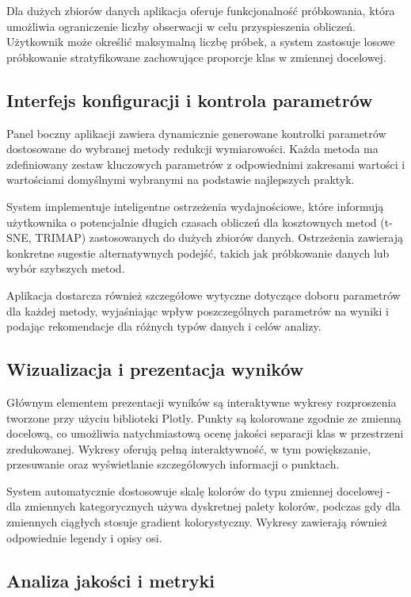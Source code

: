 \documentclass[a4paper, 12pt]{article}
\begin{document}
Dla dużych zbiorów danych aplikacja oferuje funkcjonalność próbkowania, która umożliwia ograniczenie liczby obserwacji w celu przyspieszenia obliczeń. Użytkownik może określić maksymalną liczbę próbek, a system zastosuje losowe próbkowanie stratyfikowane zachowujące proporcje klas w zmiennej docelowej.

\subsection{Interfejs konfiguracji i kontrola parametrów}

Panel boczny aplikacji zawiera dynamicznie generowane kontrolki parametrów dostosowane do wybranej metody redukcji wymiarowości. Każda metoda ma zdefiniowany zestaw kluczowych parametrów z odpowiednimi zakresami wartości i wartościami domyślnymi wybranymi na podstawie najlepszych praktyk.

System implementuje inteligentne ostrzeżenia wydajnościowe, które informują użytkownika o potencjalnie długich czasach obliczeń dla kosztownych metod (t-SNE, TRIMAP) zastosowanych do dużych zbiorów danych. Ostrzeżenia zawierają konkretne sugestie alternatywnych podejść, takich jak próbkowanie danych lub wybór szybszych metod.

Aplikacja dostarcza również szczegółowe wytyczne dotyczące doboru parametrów dla każdej metody, wyjaśniając wpływ poszczególnych parametrów na wyniki i podając rekomendacje dla różnych typów danych i celów analizy.

\subsection{Wizualizacja i prezentacja wyników}

Głównym elementem prezentacji wyników są interaktywne wykresy rozproszenia tworzone przy użyciu biblioteki Plotly. Punkty są kolorowane zgodnie ze zmienną docelową, co umożliwia natychmiastową ocenę jakości separacji klas w przestrzeni zredukowanej. Wykresy oferują pełną interaktywność, w tym powiększanie, przesuwanie oraz wyświetlanie szczegółowych informacji o punktach.

System automatycznie dostosowuje skalę kolorów do typu zmiennej docelowej - dla zmiennych kategorycznych używa dyskretnej palety kolorów, podczas gdy dla zmiennych ciągłych stosuje gradient kolorystyczny. Wykresy zawierają również odpowiednie legendy i opisy osi.

\subsection{Analiza jakości i metryki}
\end{document}
